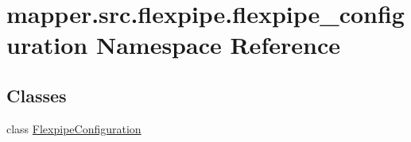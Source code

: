 \hypertarget{namespacemapper_1_1src_1_1flexpipe_1_1flexpipe__configuration}{}\section{mapper.\+src.\+flexpipe.\+flexpipe\+\_\+configuration Namespace Reference}
\label{namespacemapper_1_1src_1_1flexpipe_1_1flexpipe__configuration}
\subsection*{Classes}
\begin{DoxyCompactItemize}
\item 
class \hyperlink{classmapper_1_1src_1_1flexpipe_1_1flexpipe__configuration_1_1_flexpipe_configuration}{Flexpipe\+Configuration}
\end{DoxyCompactItemize}

